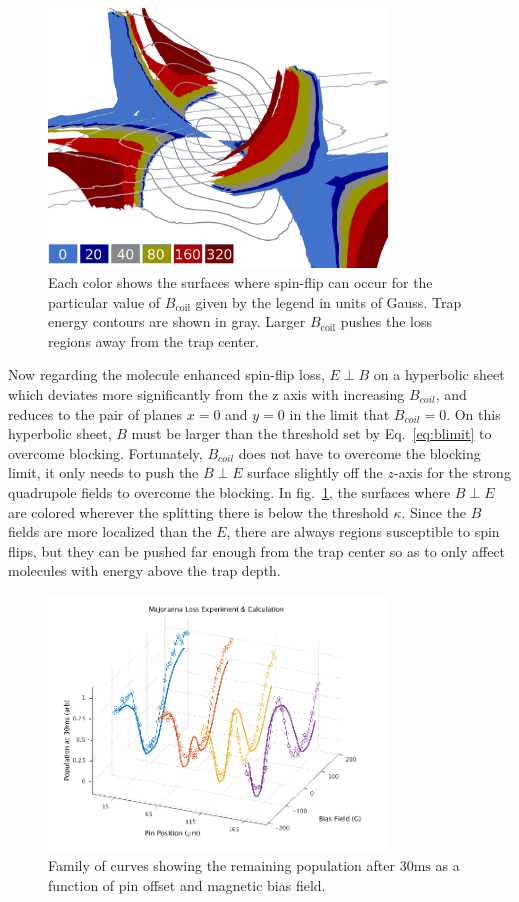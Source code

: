 \documentclass[%
 reprint,
 amsmath,amssymb,
 aps,
prl,
]{revtex4-1}
\begin{document}
\begin{figure}
\includegraphics[width=90mm]{Loss_Surface_Chunks_recolored_legend.png}%
\caption{
Each color shows the surfaces where spin-flip can occur for the particular value of $B_\text{coil}$ given by the legend in units of Gauss. Trap energy contours are shown in gray. Larger $B_\text{coil}$ pushes the loss regions away from the trap center.
\label{fig:LSurfs}}
\end{figure}

Now regarding the molecule enhanced spin-flip loss, $E\!\perp\! B$ on a hyperbolic sheet which deviates more significantly from the z axis with increasing $B_{coil}$, and reduces to the pair of planes $x=0$ and $y=0$ in the limit that $B_{coil} = 0$. On this hyperbolic sheet, $B$ must be larger than the threshold set by Eq.~\ref{eq:blimit} to overcome blocking. Fortunately, $B_{coil}$ does not have to overcome the blocking limit, it only needs to push the $B\!\perp\! E$ surface slightly off the $z$-axis for the strong  quadrupole fields to overcome the blocking. In fig.~\ref{fig:LSurfs}, the surfaces where $B\!\perp\! E$ are colored wherever the splitting there is below the threshold $\kappa$. Since the $B$ fields are more localized than the $E$, there are always regions susceptible to spin flips, but they can be pushed far enough from the trap center so as to only affect molecules with energy above the trap depth.

\begin{figure}
\includegraphics[width=90mm]{V-to-W-plot-3D-dave.png}%
\caption{
Family of curves showing the remaining population after $30 \text{ms}$ as a function of pin offset and magnetic bias field.
\label{fig:WVplot}}
\end{figure}
\end{document}
